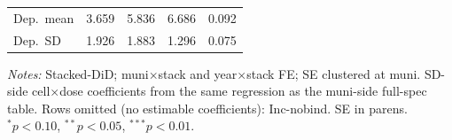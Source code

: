 \begin{table}[!htbp]
{\begin{tabular}{lcccc}
    Dep.\ mean & 3.659 & 5.836 & 6.686 & 0.092 \\
    Dep.\ SD & 1.926 & 1.883 & 1.296 & 0.075 \\
    \bottomrule
  \end{tabular}
  }
  \vspace{0.3em}
  \begin{minipage}{0.95\textwidth}
    \footnotesize \textit{Notes:} Stacked-DiD; muni$\times$stack and year$\times$stack FE; SE clustered at muni. SD-side cell$\times$dose coefficients from the same regression as the muni-side full-spec table. Rows omitted (no estimable coefficients): Inc-nobind. SE in parens. $^{*}p<0.10$, $^{**}p<0.05$, $^{***}p<0.01$.
  \end{minipage}
\end{table}
